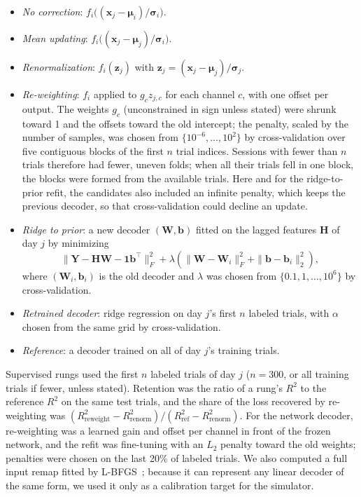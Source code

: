 \documentclass{iopjournal}
\begin{document}
\begin{itemize}
\item \textit{No correction}: $f_i\big((\mathbf{x}_j - \boldsymbol{\mu}_i)/\boldsymbol{\sigma}_i\big)$.
\item \textit{Mean updating}: $f_i\big((\mathbf{x}_j - \boldsymbol{\mu}_j)/\boldsymbol{\sigma}_i\big)$.
\item \textit{Renormalization}: $f_i(\mathbf{z}_j)$ with $\mathbf{z}_j = (\mathbf{x}_j - \boldsymbol{\mu}_j)/
\boldsymbol{\sigma}_j$.
\item \textit{Re-weighting}: $f_i$ applied to $g_c z_{j,c}$ for each channel $c$, with one offset per output. The weights
$g_c$ (unconstrained in sign unless stated) were shrunk toward 1 and the offsets toward the old intercept; the penalty,
scaled by the number of samples, was chosen from $\{10^{-6}, \ldots, 10^2\}$ by cross-validation over five contiguous
blocks of the first $n$ trial indices. Sessions with fewer than $n$ trials therefore had fewer, uneven folds; when all
their trials fell in one block, the blocks were formed from the available trials. Here and for the ridge-to-prior refit, the candidates also included an infinite penalty, which keeps
the previous decoder, so that cross-validation could decline an update.
\item \textit{Ridge to prior}: a new decoder $(\mathbf{W}, \mathbf{b})$ fitted on the lagged features $\mathbf{H}$ of day
$j$ by minimizing
\begin{equation}
\|\mathbf{Y} - \mathbf{H}\mathbf{W} - \mathbf{1}\mathbf{b}^\top\|_F^2 + \lambda\left(\|\mathbf{W} - \mathbf{W}_i\|_F^2
+ \|\mathbf{b} - \mathbf{b}_i\|_2^2\right),
\label{eq:prior}
\end{equation}
where $(\mathbf{W}_i, \mathbf{b}_i)$ is the old decoder and $\lambda$ was chosen from $\{0.1, 1, \ldots, 10^6\}$ by
cross-validation.
\item \textit{Retrained decoder}: ridge regression on day $j$'s first $n$ labeled trials, with $\alpha$ chosen from the same
grid by cross-validation.
\item \textit{Reference}: a decoder trained on all of day $j$'s training trials.
\end{itemize}

\noindent Supervised rungs used the first $n$ labeled trials of day $j$ ($n = 300$, or all training trials if fewer,
unless stated). Retention was the ratio of a rung's $R^2$ to the reference $R^2$ on the same test trials, and the share
of the loss recovered by re-weighting was $(R^2_{\text{reweight}} - R^2_{\text{renorm}})/(R^2_{\text{ref}} -
R^2_{\text{renorm}})$. For the network decoder, re-weighting was a learned gain and offset per channel in front of the
frozen network, and the refit was fine-tuning with an $L_2$ penalty toward the old weights; penalties were chosen on the
last 20\% of labeled trials. We also computed a full input remap fitted by L-BFGS~\cite{liu1989}; because it can represent
any linear decoder of the same form, we used it only as a calibration target for the simulator.
\end{document}
